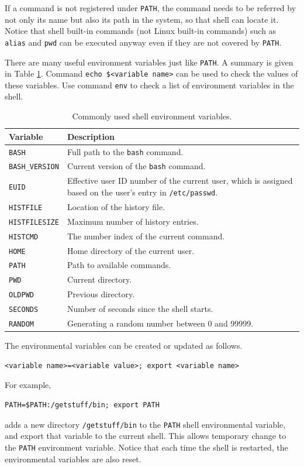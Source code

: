 If a command is not registered under \verb|PATH|, the command needs to be referred by not only its name but also its path in the system, so that shell can locate it. Notice that shell built-in commands (not Linux built-in commands) such as \verb|alias| and \verb|pwd| can be executed anyway even if they are not covered by \verb|PATH|.

There are many useful environment variables just like \verb|PATH|. A summary is given in Table \ref{ch:sb:tab:shellenvironmentvars}. Command \verb|echo $<variable name>| can be used to check the values of these variables. Use command \verb|env| to check a list of environment variables in the shell.

\begin{table}[!htb]
	\centering \caption{Commonly used shell environment variables.}\label{ch:sb:tab:shellenvironmentvars}
	\begin{tabularx}{\textwidth}{lX}
		\hline
		Variable & Description \\ \hline
		\verb|BASH| & Full path to the \verb|bash| command. \\ 
		\verb|BASH_VERSION| & Current version of the \verb|bash| command. \\ 
		\verb|EUID| & Effective user ID number of the current user, which is assigned based on the user's entry in \verb|/etc/passwd|. \\ 
		\verb|HISTFILE| & Location of the history file. \\ 
		\verb|HISTFILESIZE| & Maximum number of history entries. \\ 
		\verb|HISTCMD| & The number index of the current command. \\ 
		\verb|HOME| & Home directory of the current user. \\ 
		\verb|PATH| & Path to available commands. \\ 
		\verb|PWD| & Current directory. \\ 
		\verb|OLDPWD| & Previous directory. \\ 
		\verb|SECONDS| & Number of seconds since the shell starts. \\ 
		\verb|RANDOM| & Generating a random number between 0 and 99999. \\
		\hline
	\end{tabularx}
\end{table}

The environmental variables can be created or updated as follows.
\begin{lstlisting}
<variable name>=<variable value>; export <variable name>
\end{lstlisting}
For example,
\begin{lstlisting}
PATH=$PATH:/getstuff/bin; export PATH
\end{lstlisting}
adds a new directory \verb|/getstuff/bin| to the \verb|PATH| shell environmental variable, and export that variable to the current shell. This allows temporary change to the \verb|PATH| environment variable. Notice that each time the shell is restarted, the environmental variables are also reset. 

